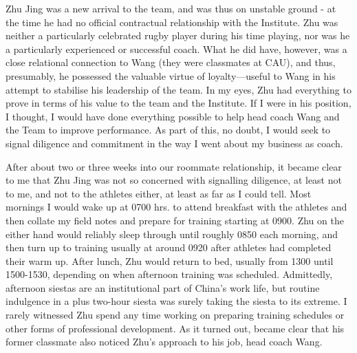\begin{CJK}{UTF8}{gbsn}
Zhu Jing was a new arrival to the team, and was thus on unstable ground - at the time he had no official contractual relationship with the Institute.  Zhu was neither a particularly celebrated rugby player during his time playing, nor was he a particularly experienced or successful coach.  What he did have, however, was a close relational connection to Wang (they were classmates at CAU), and thus, presumably, he possessed the valuable virtue of loyalty---useful to Wang in his attempt to stabilise his leadership of the team.  In my eyes, Zhu had everything to prove in terms of his value to the team and the Institute.  If I were in his position, I thought, I would have done everything possible to help head coach Wang and the Team to improve performance.  As part of this, no doubt, I would seek to signal diligence and commitment in the way I went about my business as coach.

After about two or three weeks into our roommate relationship, it became clear to me that Zhu Jing was not so concerned with signalling diligence, at least not to me, and not to the athletes either, at least as far as I could tell.  Most mornings I would wake up at 0700 hrs. to attend breakfast with the athletes and then collate my field notes and prepare for training starting at 0900. Zhu on the either hand would reliably sleep through until roughly 0850 each morning, and then turn up to training usually at around 0920 after athletes had completed their warm up.  After lunch, Zhu would return to bed, usually from 1300 until 1500-1530, depending on when afternoon training was scheduled. Admittedly, afternoon siestas are an institutional part of China's work life, but routine indulgence in a plus two-hour siesta was surely taking the siesta to its extreme.  I rarely witnessed Zhu spend any time working on preparing training schedules or other forms of professional development.  As it turned out, became clear that his former classmate also noticed Zhu's approach to his job, head coach Wang.


\end{CJK}
